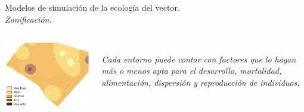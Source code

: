 \begin{frame}[c]{Modelos de simulación de la ecología del vector.\\\textit{Zonificación.}}

  \begin{center}
   \begin{columns}[T]
        \begin{column}[T]{4cm}
              \includegraphics[width=\textwidth]{./graphics/zonificacion-intro.png}
        \end{column}
        \begin{column}[T]{6cm}
          \textit{\\Cada entorno puede contar con factores que lo hagan más o menos apta para el desarrollo, mortalidad, alimentación, dispersión y reproducción de individuos.}
        \end{column}
    \end{columns}
  \end{center}
\end{frame}

